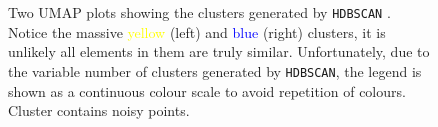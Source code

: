 \begin{figure}[th]
\begin{subfigure}[b]{0.45\textwidth}
     \end{subfigure}
     \label{fig:c3lr-hdbscan-results}
     \caption{Two UMAP plots showing the clusters generated by \texttt{HDBSCAN} \parencite{McInnes2017Hdbscan:Clustering}. Notice the massive \textcolor{yellow}{yellow} (left) and \textcolor{blue}{blue} (right) clusters, it is unlikely all elements in them are truly similar. Unfortunately, due to the variable number of clusters generated by \texttt{HDBSCAN}, the legend is shown as a continuous colour scale to avoid repetition of colours. Cluster  contains noisy points.}
\end{figure}